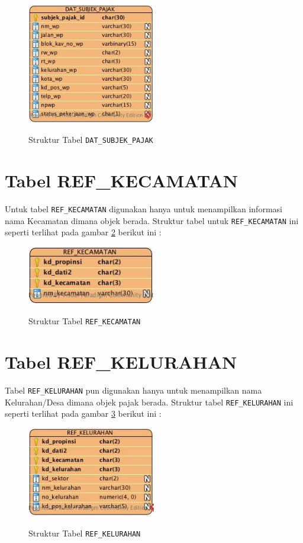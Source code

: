 \begin{figure}[H]
	\centering
	\includegraphics[width=0.5\textwidth]{./resources/struktur-tabel-dat-sp}
	\label{fig:struktur-tabel-dat-sp}
	\caption{Struktur Tabel \texttt{DAT\_SUBJEK\_PAJAK}}
\end{figure}

\section{Tabel REF\_KECAMATAN}

Untuk tabel \texttt{REF\_KECAMATAN} digunakan hanya untuk menampilkan informasi nama Kecamatan dimana objek berada. Struktur tabel untuk \texttt{REF\_KECAMATAN} ini seperti terlihat pada gambar \ref{fig:struktur-tabel-ref-kec} berikut ini :

\begin{figure}[H]
	\centering
	\includegraphics[width=0.5\textwidth]{./resources/struktur-tabel-ref-kec}
	\label{fig:struktur-tabel-ref-kec}
	\caption{Struktur Tabel \texttt{REF\_KECAMATAN}}
\end{figure}

\section{Tabel REF\_KELURAHAN}

Tabel \texttt{REF\_KELURAHAN} pun digunakan hanya untuk menampilkan nama Kelurahan/Desa dimana objek pajak berada. Struktur tabel \texttt{REF\_KELURAHAN} ini seperti terlihat pada gambar \ref{fig:struktur-tabel-ref-kel} berikut ini :

\begin{figure}[H]
	\centering
	\includegraphics[width=0.5\textwidth]{./resources/struktur-tabel-ref-kel}
	\label{fig:struktur-tabel-ref-kel}
	\caption{Struktur Tabel \texttt{REF\_KELURAHAN}}
\end{figure}